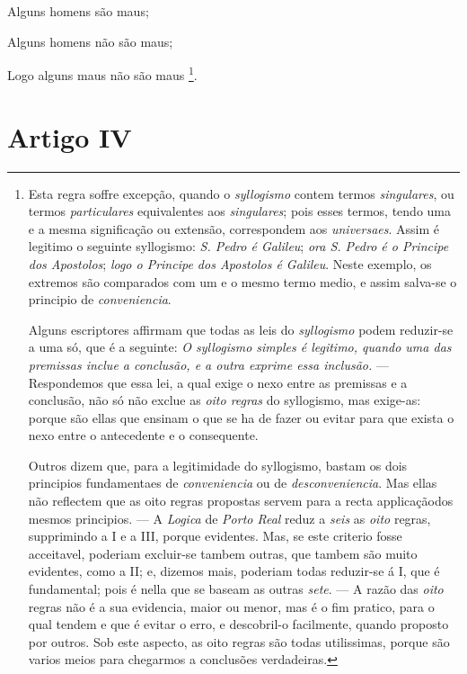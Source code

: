 Alguns homens são maus;

Alguns homens não são maus;

Logo alguns maus não são maus \footnote{Esta regra soffre excepção, quando o \emph{syllogismo} contem termos \emph{singulares}, ou termos \emph{particulares} equivalentes aos \emph{singulares}; pois esses termos, tendo uma e a mesma significação ou extensão, correspondem aos \emph{universaes}. Assim é legitimo o seguinte syllogismo: \emph{S. Pedro é Galileu}; \emph{ora S. Pedro é o Principe dos Apostolos}; \emph{logo o Principe dos Apostolos é Galileu}. Neste exemplo, os extremos são comparados com um e o mesmo termo medio, e assim salva-se o principio de \emph{conveniencia}.\par Alguns escriptores affirmam que todas as leis do \emph{syllogismo} podem reduzir-se a uma só, que é a seguinte: \emph{O syllogismo simples é legitimo, quando uma das premissas inclue a conclusão, e a outra exprime essa inclusão.} --- Respondemos que essa lei, a qual exige o nexo entre as premissas e a conclusão, não só não exclue as \emph{oito regras} do syllogismo, mas exige-as: porque são ellas que ensinam o que se ha de fazer ou evitar para que exista o nexo entre o antecedente e o consequente.\par Outros dizem que, para a legitimidade do syllogismo, bastam os dois principios fundamentaes de \emph{conveniencia} ou de \emph{desconveniencia}. Mas ellas não reflectem que as oito regras propostas servem para a recta applicaçãodos mesmos principios. --- A \emph{Logica} de \emph{Porto Real} reduz a \emph{seis} as \emph{oito} regras, supprimindo a I e a III, porque evidentes. Mas, se este criterio fosse acceitavel, poderiam excluir-se tambem outras, que tambem são muito evidentes, como a II; e, dizemos mais, poderiam todas reduzir-se á I, que é fundamental; pois é nella que se baseam as outras \emph{sete}. --- A razão das \emph{oito} regras não é a sua evidencia, maior ou menor, mas é o fim pratico, para o qual tendem e que é evitar o erro, e descobril-o facilmente, quando proposto por outros. Sob este aspecto, as oito regras são todas utilissimas, porque são varios meios para chegarmos a conclusões verdadeiras.}.


\section*{Artigo IV}

